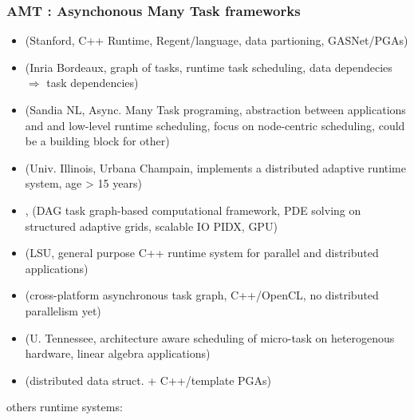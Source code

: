 \begin{frame}
  \frametitle{AMT : Asynchonous Many Task frameworks}
  
  \begin{itemize}
  \item {} (Stanford, C++ Runtime, Regent/language, data partioning, GASNet/PGAs)
  \item {} (Inria Bordeaux, graph of tasks, runtime task scheduling, data dependecies $\Rightarrow$ task dependencies)
  \item {} (Sandia NL, Async. Many Task programing, abstraction between applications and and low-level runtime scheduling, focus on node-centric scheduling, could be a building block for other)
  \item {} (Univ. Illinois, Urbana Champain, implements a distributed adaptive runtime system, age > 15 years)
  \item {}, (DAG task graph-based computational framework, PDE solving on structured adaptive grids, scalable IO PIDX, GPU)
  \item {} (LSU, general purpose C++ runtime system for parallel and distributed applications)
  \item {} (cross-platform asynchronous task graph, C++/OpenCL, no distributed parallelism yet)
  \item {} (U. Tennessee, architecture aware scheduling of micro-task on heterogenous hardware, linear algebra applications)
  \item {} (distributed data struct. + C++/template PGAs)
  \end{itemize}

  {\small
    others runtime systems: \\
  }

  
\end{frame}
